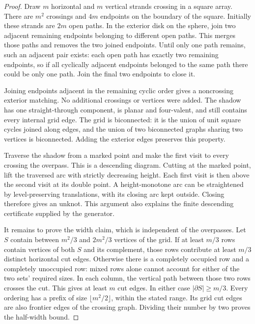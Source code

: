 \documentclass[11pt]{article}
\theoremstyle{definition}\newtheorem{definition}[theorem]{Definition}
\theoremstyle{remark}\newtheorem{remark}[theorem]{Remark}
\begin{document}
\begin{proof}
Draw $m$ horizontal and $m$ vertical strands crossing in a square array. There
are $m^2$ crossings and $4m$ endpoints on the boundary of the square. Initially
these strands are $2m$ open paths. In the exterior disk on the sphere, join two
adjacent remaining endpoints belonging to different open paths. This merges
those paths and removes the two joined endpoints. Until only one path remains,
such an adjacent pair exists: each open path has exactly two remaining endpoints,
so if all cyclically adjacent endpoints belonged to the same path there could
be only one path. Join the final two endpoints to close it.

Joining endpoints adjacent in the remaining cyclic order gives a noncrossing
exterior matching. No additional crossings or vertices were added. The shadow
has one straight-through component, is planar and four-valent, and still contains
every internal grid edge. The grid is biconnected: it is the union of unit square
cycles joined along edges, and the union of two biconnected graphs sharing two
vertices is biconnected. Adding the exterior edges preserves this property.

Traverse the shadow from a marked point and make the first visit to every
crossing the overpass. This is a descending diagram. Cutting at the marked point,
lift the traversed arc with strictly decreasing height. Each first visit is then
above the second visit at its double point. A height-monotone arc can be straightened
by level-preserving translations, with its closing arc kept outside. Closing
therefore gives an unknot. This argument also explains the finite descending
certificate supplied by the generator.

It remains to prove the width claim, which is independent of the overpasses.
Let $S$ contain between $m^2/3$ and $2m^2/3$ vertices of the grid. If at least
$m/3$ rows contain vertices of both $S$ and its complement, those rows contribute
at least $m/3$ distinct horizontal cut edges. Otherwise there is a completely
occupied row and a completely unoccupied row: mixed rows alone cannot account
for either of the two sets' required sizes. In each column, the vertical path
between those two rows crosses the cut. This gives at least $m$ cut edges.
In either case $|\partial S|\ge m/3$. Every ordering has a prefix of size
$\lfloor m^2/2\rfloor$, within the stated range. Its grid cut edges are also
frontier edges of the crossing graph. Dividing their number by two proves the
half-width bound.
\end{proof}
\end{document}
